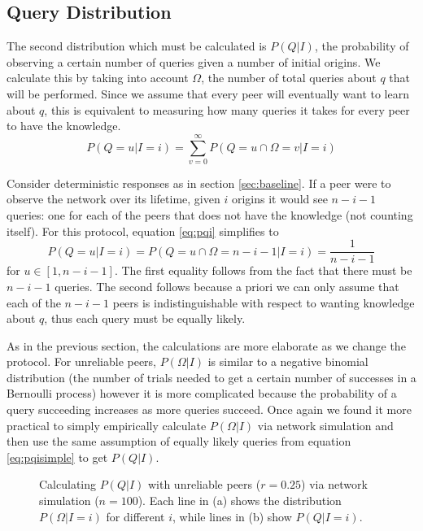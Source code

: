 \documentclass{article}
\newcommand{\eqnref}[1]{equation \eqref{eq:#1}}
\newcommand{\secref}[1]{section \ref{sec:#1}}
\begin{document}
\subsection{Query Distribution}\label{sec:qgiveni}

The second distribution which must be calculated is $P(Q|I)$, the probability of
observing a certain number of queries given a number of initial origins. We
calculate this by taking into account $\Omega$, the number of total queries
about $q$ that will be performed. Since we assume that every peer will
eventually want to learn about $q$, this is equivalent to measuring how many
queries it takes for every peer to have the knowledge.
\begin{equation}\label{eq:pqi}
	P(Q=u|I=i)=\sum_{v=0}^\infty P(Q=u\cap\Omega=v|I=i)
\end{equation}

Consider deterministic responses as in \secref{baseline}. If a peer were to
observe the network over its lifetime, given $i$ origins it would see $n-i-1$
queries: one for each of the peers that does not have the knowledge (not
counting itself). For this protocol, \eqnref{pqi} simplifies to
\begin{equation}\label{eq:pqisimple}
	P(Q=u|I=i)=P(Q=u\cap\Omega=n-i-1|I=i)=\frac{1}{n-i-1}
\end{equation}
for $u\in[1,n-i-1]$. The first equality follows from the fact that there must be
$n-i-1$ queries. The second follows because a priori we can only assume that
each of the $n-i-1$ peers is indistinguishable with respect to wanting knowledge
about $q$, thus each query must be equally likely.

As in the previous section, the calculations are more elaborate as we change the
protocol. For unreliable peers, $P(\Omega|I)$ is similar to a negative binomial
distribution (the number of trials needed to get a certain number of successes
in a Bernoulli process) however it is more complicated because the probability
of a query succeeding increases as more queries succeed. Once again we found it
more practical to simply empirically calculate $P(\Omega|I)$ via network
simulation and then use the same assumption of equally likely queries from
\eqnref{pqisimple} to get $P(Q|I)$.

\begin{figure}%
    \centering
	\caption{Calculating $P(Q|I)$ with unreliable peers ($r=0.25$) via network
	simulation ($n=100$). Each line in (a) shows the distribution
	$P(\Omega|I=i)$ for different $i$, while lines in (b) show $P(Q|I=i)$.}
    \label{fig:unreliable}%
\end{figure}
\end{document}
